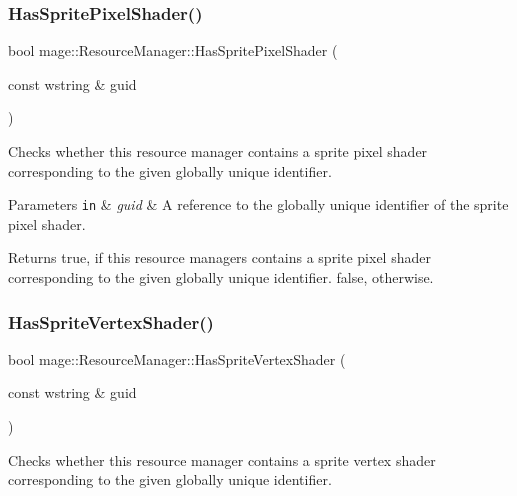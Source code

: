 \subsubsection{\texorpdfstring{Has\+Sprite\+Pixel\+Shader()}{HasSpritePixelShader()}}
{\footnotesize\ttfamily bool mage\+::\+Resource\+Manager\+::\+Has\+Sprite\+Pixel\+Shader (\begin{DoxyParamCaption}\item[{const wstring \&}]{guid }\end{DoxyParamCaption})\hspace{0.3cm}{\ttfamily [noexcept]}}

Checks whether this resource manager contains a sprite pixel shader corresponding to the given globally unique identifier.


\begin{DoxyParams}[1]{Parameters}
\mbox{\tt in}  & {\em guid} & A reference to the globally unique identifier of the sprite pixel shader. \\
\hline
\end{DoxyParams}
\begin{DoxyReturn}{Returns}
{\ttfamily true}, if this resource managers contains a sprite pixel shader corresponding to the given globally unique identifier. {\ttfamily false}, otherwise. 
\end{DoxyReturn}
\hypertarget{classmage_1_1_resource_manager_a03b2fd29460628ae0be3ec634c9a9683}{}\label{classmage_1_1_resource_manager_a03b2fd29460628ae0be3ec634c9a9683} 
\subsubsection{\texorpdfstring{Has\+Sprite\+Vertex\+Shader()}{HasSpriteVertexShader()}}
{\footnotesize\ttfamily bool mage\+::\+Resource\+Manager\+::\+Has\+Sprite\+Vertex\+Shader (\begin{DoxyParamCaption}\item[{const wstring \&}]{guid }\end{DoxyParamCaption})\hspace{0.3cm}{\ttfamily [noexcept]}}

Checks whether this resource manager contains a sprite vertex shader corresponding to the given globally unique identifier.


